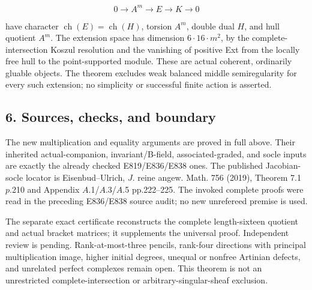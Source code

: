 \[
                      0\longrightarrow A^m
                      \longrightarrow E\longrightarrow K
                      \longrightarrow0
 \tag{E840.18}
\]

have character \(\operatorname{ch}(E)=\operatorname{ch}(H)\), torsion
\(A^m\), double dual \(H\), and hull quotient \(A^m\). The extension
space has dimension \(6\cdot16\cdot m^2\), by the complete-intersection
Koszul resolution and the vanishing of positive Ext from the locally
free hull to the point-supported module. These are actual coherent,
ordinarily gluable objects. The theorem excludes weak balanced middle
semiregularity for every such extension; no simplicity or successful
finite action is asserted.

\subsection{6. Sources, checks, and
boundary}\label{SF-E840:sources-checks-and-boundary}

The new multiplication and equality arguments are proved in full above.
Their inherited actual-companion, invariant/B-field, associated-graded,
and socle inputs are exactly the already checked E819/E836/E838 ones.
The published Jacobian-socle locator is Eisenbud--Ulrich, \(J\). reine
angew. Math. 756 (2019), Theorem 7.1 \(p\).210 and Appendix
\(A\).1/\(A\).3/\(A\).5 pp.222--225. The invoked complete proofs were
read in the preceding E836/E838 source audit; no new unrefereed premise
is used.

The separate exact certificate reconstructs the complete length-sixteen
quotient and actual bracket matrices; it supplements the universal
proof. Independent review is pending. Rank-at-most-three pencils,
rank-four directions with principal multiplication image, higher initial
degrees, unequal or nonfree Artinian defects, and unrelated perfect
complexes remain open. This theorem is not an unrestricted
complete-intersection or arbitrary-singular-sheaf exclusion.
